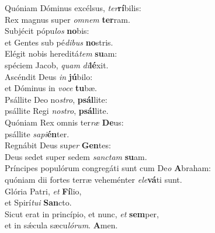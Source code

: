 \evenverse Quóniam Dóminus excélsus, \textit{ter}\textbf{rí}bilis:~\*\\
\evenverse Rex magnus super \textit{om}\textit{nem} \textbf{ter}ram.\\
\oddverse Subjécit pópu\textit{los} \textbf{no}bis:~\*\\
\oddverse et Gentes sub pé\textit{di}\textit{bus} \textbf{no}stris.\\
\evenverse Elégit nobis hereditá\textit{tem} \textbf{su}am:~\*\\
\evenverse spéciem Jacob, \textit{quam} \textit{di}\textbf{lé}xit.\\
\oddverse Ascéndit Deus \textit{in} \textbf{jú}bilo:~\*\\
\oddverse et Dóminus in \textit{vo}\textit{ce} \textbf{tu}bæ.\\
\evenverse Psállite Deo no\textit{stro}, \textbf{psál}lite:~\*\\
\evenverse psállite Regi \textit{no}\textit{stro}, \textbf{psál}lite.\\
\oddverse Quóniam Rex omnis ter\textit{ræ} \textbf{De}us:~\*\\
\oddverse psállite \textit{sa}\textit{pi}\textbf{én}ter.\\
\evenverse Regnábit Deus su\textit{per} \textbf{Gen}tes:~\*\\
\evenverse Deus sedet super sedem \textit{san}\textit{ctam} \textbf{su}am.\\
\oddverse Príncipes populórum congregáti sunt cum De\textit{o} \textbf{A}braham:~\*\\
\oddverse quóniam dii fortes terræ veheménter \textit{e}\textit{le}\textbf{vá}ti sunt.\\
\evenverse Glória Patri, \textit{et} \textbf{Fí}lio,~\*\\
\evenverse et Spirí\textit{tu}\textit{i} \textbf{San}cto.\\
\oddverse Sicut erat in princípio, et nunc, \textit{et} \textbf{sem}per,~\*\\
\oddverse et in sǽcula sæcu\textit{ló}\textit{rum}. \textbf{A}men.\\
